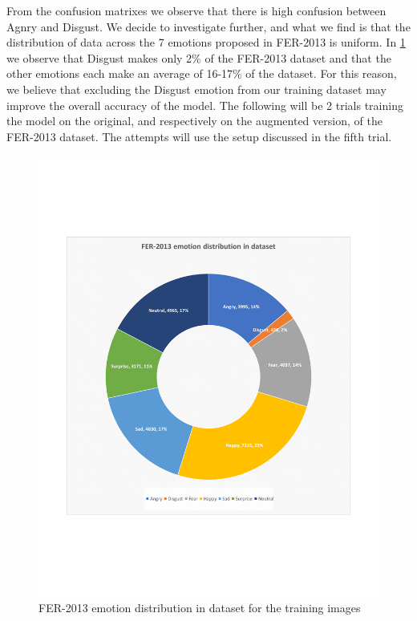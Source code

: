 \documentclass[runningheads,a4paper,11pt]{report}
\begin{document}
From the confusion matrixes we observe that there is high confusion between Agnry and Disgust. We decide to investigate further, and what we find is that the distribution of data across the 7 emotions proposed in FER-2013 is uniform. In \ref{FER-2013-emotion-dataset-size} we observe that Disgust makes only 2\% of the FER-2013 dataset and that the other emotions each make an average of 16-17\% of the dataset. For this reason, we believe that excluding the Disgust emotion from our training dataset may improve the overall accuracy of the model. The following will be 2 trials training the model on the original, and respectively on the augmented version, of the FER-2013 dataset. The attempts will use the setup discussed in the fifth trial.

\begin{figure}[htbp]
\begin{center}
	\includegraphics[scale=0.8]{Fig/FER-2013-emotion-dataset-size.pdf}
	\caption{FER-2013 emotion distribution in dataset for the training images}
	\label{FER-2013-emotion-dataset-size}
\end{center}
\end{figure}
\end{document}
